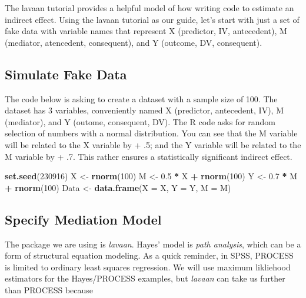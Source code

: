\documentclass[
  11pt,
]{book}
\newenvironment{Shaded}{\begin{snugshade}}{\end{snugshade}}
\newcommand{\AttributeTok}[1]{\textcolor[rgb]{0.27,0.27,0.27}{#1}}
\newcommand{\DecValTok}[1]{\textcolor[rgb]{0.06,0.06,0.06}{#1}}
\newcommand{\FloatTok}[1]{\textcolor[rgb]{0.06,0.06,0.06}{#1}}
\newcommand{\FunctionTok}[1]{\textcolor[rgb]{0.27,0.27,0.27}{\textbf{#1}}}
\newcommand{\NormalTok}[1]{#1}
\newcommand{\OtherTok}[1]{\textcolor[rgb]{0.37,0.37,0.37}{#1}}
\newcommand{\SpecialCharTok}[1]{\textcolor[rgb]{0.43,0.43,0.43}{\textbf{#1}}}
\begin{document}
The lavaan tutorial \citep{rosseel_lavaan_2020} provides a helpful model of how writing code to estimate an indirect effect. Using the lavaan tutorial as our guide, let's start with just a set of fake data with variable names that represent X (predictor, IV, antecedent), M (mediator, atencedent, consequent), and Y (outcome, DV, consequent).

\hypertarget{simulate-fake-data}{%
\subsection{Simulate Fake Data}\label{simulate-fake-data}}

The code below is asking to create a dataset with a sample size of 100. The dataset has 3 variables, conveniently named X (predictor, antecedent, IV), M (mediator), and Y (outome, consequent, DV). The R code asks for random selection of numbers with a normal distribution. You can see that the M variable will be related to the X variable by + .5; and the Y variable will be related to the M variable by + .7. This rather ensures a statistically significant indirect effect.

\begin{Shaded}
\begin{Highlighting}[]
\FunctionTok{set.seed}\NormalTok{(}\DecValTok{230916}\NormalTok{)}
\NormalTok{X }\OtherTok{\textless{}{-}} \FunctionTok{rnorm}\NormalTok{(}\DecValTok{100}\NormalTok{)}
\NormalTok{M }\OtherTok{\textless{}{-}} \FloatTok{0.5} \SpecialCharTok{*}\NormalTok{ X }\SpecialCharTok{+} \FunctionTok{rnorm}\NormalTok{(}\DecValTok{100}\NormalTok{)}
\NormalTok{Y }\OtherTok{\textless{}{-}} \FloatTok{0.7} \SpecialCharTok{*}\NormalTok{ M }\SpecialCharTok{+} \FunctionTok{rnorm}\NormalTok{(}\DecValTok{100}\NormalTok{)}
\NormalTok{Data }\OtherTok{\textless{}{-}} \FunctionTok{data.frame}\NormalTok{(}\AttributeTok{X =}\NormalTok{ X, }\AttributeTok{Y =}\NormalTok{ Y, }\AttributeTok{M =}\NormalTok{ M)}
\end{Highlighting}
\end{Shaded}

\hypertarget{specify-mediation-model}{%
\subsection{Specify Mediation Model}\label{specify-mediation-model}}

The package we are using is \emph{lavaan}. Hayes' model is \emph{path analysis}, which can be a form of structural equation modeling. As a quick reminder, in SPSS, PROCESS is limited to ordinary least squares regression. We will use maximum likliehood estimators for the Hayes/PROCESS examples, but \emph{lavaan} can take us further than PROCESS because
\end{document}
